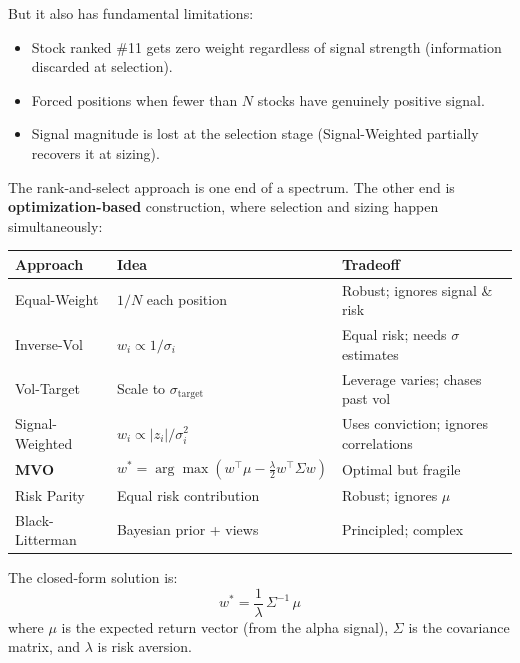 \documentclass[a4paper, 11pt]{report}
\theoremstyle{definition}
\theoremstyle{remark}
\begin{document}
\begin{description}[style=nextline, leftmargin=1.8cm]
        \medskip
        But it also has fundamental limitations:
        \begin{itemize}[nosep]
            \item Stock ranked \#11 gets zero weight regardless of
                  signal strength (information discarded at selection).
            \item Forced positions when fewer than $N$ stocks have
                  genuinely positive signal.
            \item Signal magnitude is lost at the selection stage
                  (Signal-Weighted partially recovers it at sizing).
        \end{itemize}

    \item[The Portfolio Construction Spectrum]
        The rank-and-select approach is one end of a spectrum.  The
        other end is \textbf{optimization-based} construction, where
        selection and sizing happen simultaneously:

        \medskip
        \begin{center}
        \small
        \begin{tabular}{@{}lll@{}}
        \toprule
        \textbf{Approach} & \textbf{Idea} & \textbf{Tradeoff} \\
        \midrule
        Equal-Weight   & $1/N$ each position      & Robust; ignores signal \& risk \\
        Inverse-Vol    & $w_i \propto 1/\sigma_i$  & Equal risk; needs $\sigma$ estimates \\
        Vol-Target     & Scale to $\sigma_{\text{target}}$ & Leverage varies; chases past vol \\
        Signal-Weighted & $w_i \propto |z_i|/\sigma_i^2$ & Uses conviction; ignores correlations \\
        \midrule
        \textbf{MVO}   & $w^* = \arg\max (w^\top\mu - \frac{\lambda}{2} w^\top\Sigma w)$ & Optimal but fragile \\
        Risk Parity    & Equal risk contribution   & Robust; ignores $\mu$ \\
        Black-Litterman & Bayesian prior + views   & Principled; complex \\
        \bottomrule
        \end{tabular}
        \end{center}

    \item[Mean-Variance Optimization (MVO)]
        The closed-form solution is:
        \[
            w^* = \frac{1}{\lambda}\,\Sigma^{-1}\,\mu
        \]
        where $\mu$ is the expected return vector (from the alpha
        signal), $\Sigma$ is the covariance matrix, and $\lambda$
        is risk aversion.


\end{description}
\end{document}
